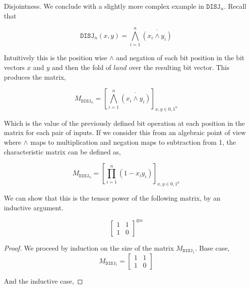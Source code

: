 \documentclass[usletter]{article}
\begin{document}
\begin{example} Disjointness.
  We conclude with a slightly more complex example in $\mathtt{DISJ}_n$. Recall that

  \begin{equation*}
    \mathtt{DISJ}_{n}(x,y) = \bigwedge_{i=1}^{n} \overline{(x_i \land y_i)}
  \end{equation*}

  Intuitively this is the position wise $\land$ and negation of each bit position in the bit vectors $x$ and $y$ and then the fold of $land$ over the resulting bit vector. This produces the matrix,

  \begin{equation*}
    M_{\mathtt{DISJ}_n} = \left[ \bigwedge_{i=1}^{n} \overline{(x_i \land y_i)} \right]_{x,y \in {0,1}^n}
  \end{equation*}

  Which is the value of the previously defined bit operation at each position in the matrix for each pair of inputs. If we consider this from an algebraic point of view where $\land$ maps to multiplication and negation maps to subtraction from 1,  the characteristic matrix can be defined as,

  \begin{equation*}
    M_{\mathtt{DISJ}_n} = \left[ \prod_{i=1}^{n} (1 - x_i y_i) \right]_{x,y \in {0,1}^n}
  \end{equation*}

  We can show that this is the tensor power of the following matrix, by an inductive argument.

  \begin{equation*}
    \begin{bmatrix}
      1 & 1 \\
      1 & 0
    \end{bmatrix}^{\otimes n}
  \end{equation*}

  \begin{proof} We proceed by induction on the size of the matrix $M_{\mathtt{DISJ}_1}$. Base case,
    \begin{equation*}
      M_{\mathtt{DISJ}_1} =
        \begin{bmatrix}
          1 & 1 \\
          1 & 0
        \end{bmatrix}
      \end{equation*}

      And the inductive case,


\end{proof}
\end{example}
\end{document}
